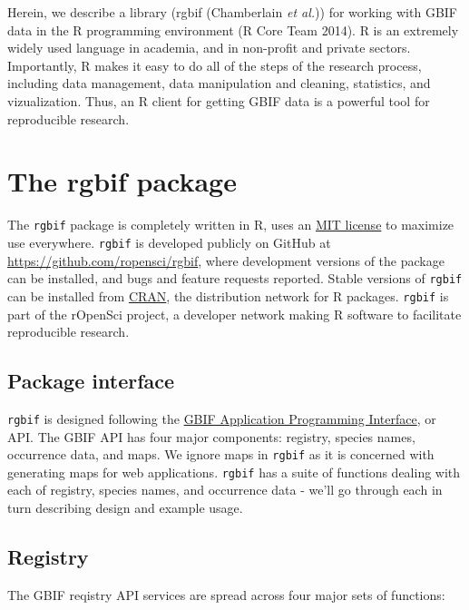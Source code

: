 \documentclass[author-year, review, 11pt]{components/elsarticle} %
\begin{document}
Herein, we describe a library (rgbif (Chamberlain \emph{et al.})) for
working with GBIF data in the R programming environment (R Core Team
2014). R is an extremely widely used language in academia, and in
non-profit and private sectors. Importantly, R makes it easy to do all
of the steps of the research process, including data management, data
manipulation and cleaning, statistics, and vizualization. Thus, an R
client for getting GBIF data is a powerful tool for reproducible
research.

\section{The rgbif package}\label{the-rgbif-package}

The \texttt{rgbif} package is completely written in R, uses an
\href{http://choosealicense.com/licenses/mit/}{MIT license} to maximize
use everywhere. \texttt{rgbif} is developed publicly on GitHub at
\href{https://github.com/ropensci/rgbif}{\url{https://github.com/ropensci/rgbif}},
where development versions of the package can be installed, and bugs and
feature requests reported. Stable versions of \texttt{rgbif} can be
installed from
\href{https://cran.rstudio.com/web/packages/rgbif/}{CRAN}, the
distribution network for R packages. \texttt{rgbif} is part of the
rOpenSci project, a developer network making R software to facilitate
reproducible research.

\subsection{Package interface}\label{package-interface}

\texttt{rgbif} is designed following the
\href{http://www.gbif.org/developer/summary}{GBIF Application
Programming Interface}, or API. The GBIF API has four major components:
registry, species names, occurrence data, and maps. We ignore maps in
\texttt{rgbif} as it is concerned with generating maps for web
applications. \texttt{rgbif} has a suite of functions dealing with each
of registry, species names, and occurrence data - we'll go through each
in turn describing design and example usage.

\subsection{Registry}\label{registry}

The GBIF reqistry API services are spread across four major sets of
functions:
\end{document}

